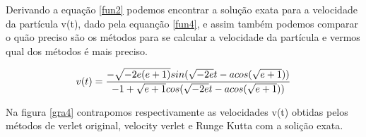 \documentclass[a4wide]{report}
\begin{document}
\newpage

Derivando a equação \ref{fun2} podemos encontrar a solução exata para a velocidade da partícula v(t), dado pela equanção \ref{fun4},
e assim também podemos comparar o quão preciso são os métodos para se calcular a velocidade da partícula e vermos qual dos métodos é mais preciso.

\begin{equation}
\centering
v(t) = \frac{-\sqrt{-2e(e+1)}sin(\sqrt{-2e}t - acos(\sqrt{e+1}))}{-1 + \sqrt{e+1}cos(\sqrt{-2e}t - acos(\sqrt{e+1}))}
\label{fun4}
\end{equation}

Na figura \ref{gra4} contrapomos respectivamente as velocidades v(t) obtidas pelos métodos de verlet original, velocity verlet e Runge Kutta com a solição exata. 
\end{document}
